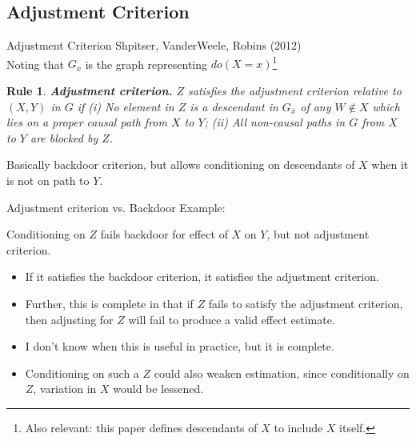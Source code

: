 \documentclass[xcolor=dvipsnames]{beamer}
\newtheorem{arule}{Rule}
\begin{document}

\subsection{Adjustment Criterion}
\begin{frame}{Adjustment Criterion}
 Shpitser, VanderWeele,  Robins (2012) \\
\bigskip
{} Noting that  $G_{\overline{x}}$ is the graph representing $do(X=x)$\footnote{Also relevant: this paper defines descendants of $X$ to include $X$ itself.} 
\begin{arule}
\textbf{Adjustment criterion.} $Z$ satisfies the adjustment criterion relative to $(X,Y)$ in  $G$ if
(i) No element in $Z$ is a descendant in $G_{\overline{x}}$ of any $W \notin X$ which lies on a proper causal path from $X$ to $Y$; (ii) All non-causal paths in $G$ from $X$ to $Y$ are blocked by $Z$.
\end{arule}

 Basically backdoor criterion, but allows conditioning on descendants of $X$ when it is not on path to $Y$.
\end{frame}

\begin{frame}{Adjustment criterion vs. Backdoor}
\small
{} Example:
\begin{center}
\end{center}

 Conditioning on $Z$  fails backdoor for effect of $X$ on $Y$, but not adjustment criterion. \\
\medskip
\footnotesize
\begin{itemize}
\item<3-> If it satisfies the backdoor criterion, it satisfies the adjustment criterion. 
\item<4-> Further, this is complete in that if $Z$ fails to satisfy the adjustment criterion, then adjusting for $Z$ will fail to produce a valid effect estimate.
\item<5-> I don't know when this is useful in practice, but it is complete.
\item<6-> Conditioning on such a $Z$ could also weaken estimation, since conditionally on $Z$, variation in $X$ would be lessened.
\end{itemize}
\end{frame}
\end{document}
